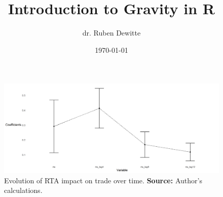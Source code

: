 \documentclass[a4paper,landscape,11pt]{article}
\title{Introduction to Gravity in R}
\author{dr. Ruben Dewitte}
\date{\today}
\begin{document}
	\maketitle
	
	








\begin{figure}[htbp]
	\centering
	\includegraphics[width=\textwidth]{fig_rta_evo.png}
	\caption{Evolution of RTA impact on trade over time. \newline
		\textbf{Source:} Author's calculations.}
	\label{fig_foreign_born}
\end{figure}


%
%
%
%
%	
\end{document}
